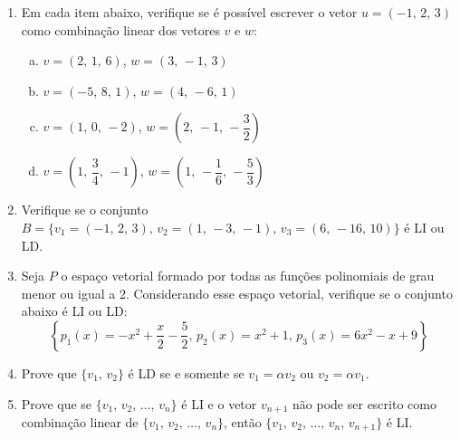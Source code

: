 \documentclass[12pt,a4paper]{article}
\begin{document}
\begin{enumerate}

  \item Em cada item abaixo, verifique se é possível escrever o vetor 
    $u = (-1,\, 2,\, 3)$ como combinação linear dos vetores $v$ e $w$:
    \begin{enumerate}[(a)]
      \item $v = (2,\, 1,\, 6)$,  $w = (3,\, -1,\, 3)$
      \item $v = (-5,\, 8,\, 1)$, $w = (4,\, -6,\, 1)$
      \item $v = (1,\, 0,\, -2)$, $w = \left(2,\, -1,\,-\dfrac{3}{2}\right)$
      \item $v = \left(1,\, \dfrac{3}{4},\, -1\right)$, $w = \left(1,\, -\dfrac{1}{6},\, -\dfrac{5}{3}\right)$
    \end{enumerate}
   
  \item Verifique se o conjunto 
    $B = \{v_1 = (-1,\, 2,\, 3),\, v_2 = (1,\, -3,\, -1),\, v_3 = (6,\, -16,\, 10)\}$ é
    LI ou LD.

  \item Seja $P$ o espaço vetorial formado por todas as funções polinomiais de
    grau menor ou igual a 2. Considerando esse espaço vetorial, verifique se o conjunto
    abaixo é LI ou LD: 
    $$\left\{p_1(x) = -x^2 + \dfrac{x}{2} - \dfrac{5}{2},\, p_2(x) = x^2 + 1,\, p_3(x) = 6x^2  - x + 9\right\}$$
    
  \item Prove que $\{v_1,\,v_2\}$ é LD se e somente se $v_1 =\alpha v_2$ ou $v_2 =\alpha v_1$.
    
  \item Prove que se $\{v_1,\, v_2,\, \ldots,\, v_n\}$ é LI e o vetor $v_{n+1}$ não
    pode ser escrito como combinação linear de $\{v_1,\, v_2,\, \ldots,\, v_n\}$,
    então $\{v_1,\, v_2,\, \ldots,\, v_n,\, v_{n+1}\}$ é LI.
  
\end{enumerate}
\end{document}
